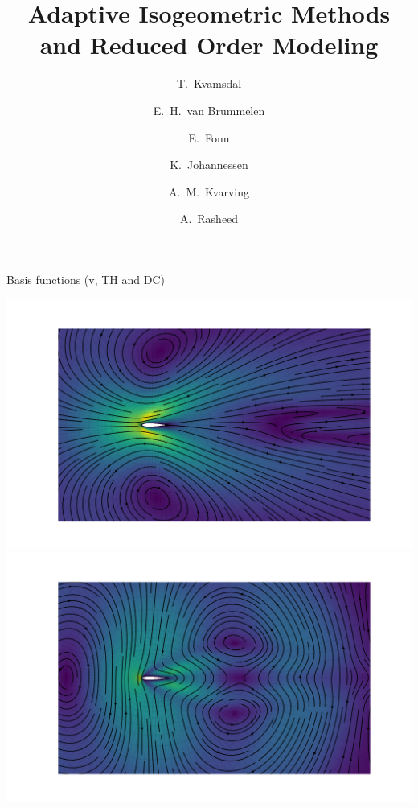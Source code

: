 \documentclass{beamer}
\begin{document}
\title[Reduced Order Models]{
  Adaptive Isogeometric Methods \\ and Reduced Order Modeling
}
\author[T.~Kvamsdal]{
  T.~Kvamsdal \and
  E.~H.~van Brummelen \and
  E.~Fonn \and
  K.~Johannessen \and
  A.~M.~Kvarving \and
  A.~Rasheed \and
}
\date[IGA 2018]{}


\begin{frame}{Basis functions (v, TH and DC)}
  \begin{center}
    \includegraphics[trim={90mm 0 95mm 0},clip,height=0.95\textheight]{figs/bfun-v-no-piola-v000}
    \includegraphics[trim={90mm 0 95mm 0},clip,height=0.95\textheight]{figs/bfun-v-piola-v000}
  \end{center}
\end{frame}
\end{document}
